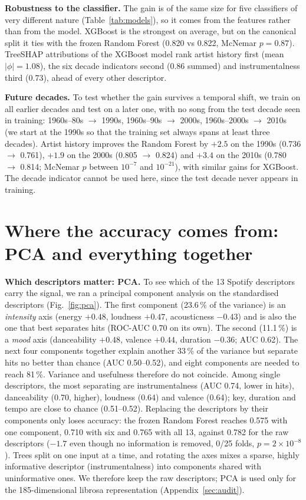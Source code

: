 \textbf{Robustness to the classifier.} The gain is of the same size for five classifiers of
very different nature (Table~\ref{tab:models}), so it comes from the features rather than
from the model. XGBoost is the strongest on average, but on the canonical split it ties with
the frozen Random Forest (0.820 vs 0.822, McNemar $p=0.87$). TreeSHAP attributions of the
XGBoost model rank artist history first (mean $|\phi|=1.08$), the six decade indicators
second (0.86 summed) and instrumentalness third (0.73), ahead of every other descriptor.

\textbf{Future decades.} To test whether the gain survives a temporal shift, we train on all
earlier decades and test on a later one, with no song from the test decade seen in
training: 1960s--80s $\to$ 1990s, 1960s--90s $\to$ 2000s, 1960s--2000s $\to$ 2010s (we start at the 1990s so that
the training set always spans at least three decades). Artist history improves the Random Forest by $+2.5$\pp{} on the 1990s
(0.736 $\to$ 0.761), $+1.9$\pp{} on the 2000s (0.805 $\to$ 0.824) and $+3.4$\pp{} on the
2010s (0.780 $\to$ 0.814; McNemar $p$ between $10^{-7}$ and $10^{-21}$), with similar gains
for XGBoost. The decade indicator cannot be used here, since the test decade never
appears in training.


\FloatBarrier
\section{Where the accuracy comes from: PCA and everything together}\label{app:ablation}
\textbf{Which descriptors matter: PCA.} To see which of the 13 Spotify descriptors carry the
signal, we ran a principal component analysis on the standardised descriptors
(Fig.~\ref{fig:pca}). The first component (23.6\,\% of the variance) is an \emph{intensity} axis
(energy $+0.48$, loudness $+0.47$, acousticness $-0.43$) and is also the one that best separates hits
(ROC-AUC 0.70 on its own). The second (11.1\,\%) is a \emph{mood} axis (danceability $+0.48$,
valence $+0.44$, duration $-0.36$; AUC 0.62). The next four components together explain another
33\,\% of the variance but separate hits no better than chance (AUC 0.50--0.52), and eight components
are needed to reach 81\,\%. Variance and usefulness therefore do not coincide. Among single descriptors,
the most separating are instrumentalness (AUC 0.74, lower in hits), danceability (0.70, higher),
loudness (0.64) and valence (0.64); key, duration and tempo are close to chance (0.51--0.52). Replacing
the descriptors by their components only loses accuracy: the frozen Random Forest reaches 0.575 with
one component, 0.710 with six and 0.765 with all 13, against 0.782 for the raw descriptors ($-1.7$\pp{}
even though no information is removed, 0/25 folds, $p=2\times10^{-8}$). Trees split on one input at a
time, and rotating the axes mixes a sparse, highly informative descriptor (instrumentalness) into
components shared with uninformative ones. We therefore keep the raw descriptors; PCA is used only for the
185-dimensional librosa representation (Appendix~\ref{sec:audit}).

